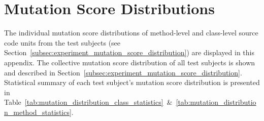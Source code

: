 \appendix
\chapter{Mutation Score Distributions}
\label{app:mutation_score_distributions}
The individual mutation score distributions of method-level and class-level source code units from the test subjects (see Section~\ref{subsec:experiment_mutation_score_distribution}) are displayed in this appendix. The collective mutation score distribution of all test subjects is shown and described in Section~\ref{subsec:experiment_mutation_score_distribution}. Statistical summary of each test subject's mutation score distribution is presented in Table~\ref{tab:mutation_distribution_class_statistics}~\&~\ref{tab:mutation_distribution_method_statistics}.

